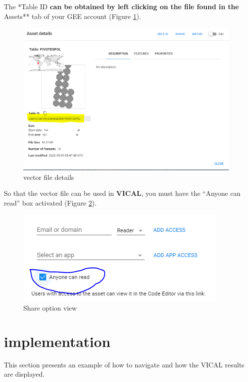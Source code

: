 \documentclass[
]{book}
\begin{document}
The *Table ID\textbf{ can be obtained by left clicking on the file found in the }Assets** tab of your GEE account (Figure \ref{fig:figG12}).

\begin{figure}

{\centering \includegraphics[width=0.75\linewidth]{./images/Figure14} 

}

\caption{vector file details}\label{fig:figG12}
\end{figure}

So that the vector file can be used in \textbf{VICAL}, you must have the ``Anyone can read'' box activated (Figure \ref{fig:figG13}).

\begin{figure}

{\centering \includegraphics[width=0.75\linewidth]{./images/Figure6} 

}

\caption{Share option view}\label{fig:figG13}
\end{figure}

\hypertarget{implementation}{%
\chapter{implementation}\label{implementation}}

This section presents an example of how to navigate and how the VICAL results are displayed.
\end{document}
